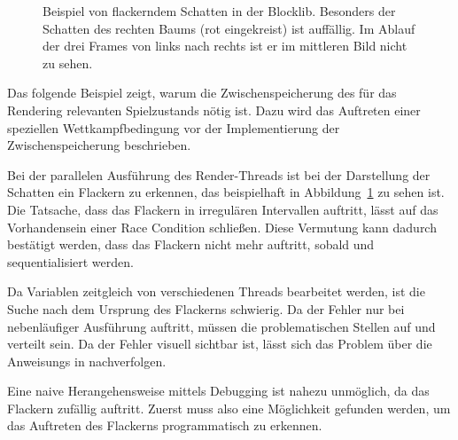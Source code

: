 \begin{figure}
	\hfill
	\hfill
	\caption[Beispiel von flackerndem Schatten in der Blocklib.]{Beispiel von flackerndem Schatten in der Blocklib. Besonders der Schatten des rechten Baums (rot eingekreist) ist auffällig. Im Ablauf der drei Frames von links nach rechts ist er im mittleren Bild nicht zu sehen.}\label{fig:flackern}
\end{figure}
Das folgende Beispiel zeigt, warum die Zwischenspeicherung des für das Rendering relevanten Spielzustands nötig ist. Dazu wird das Auftreten einer speziellen Wettkampfbedingung vor der Implementierung der Zwischenspeicherung beschrieben. 

Bei der parallelen Ausführung des Render-Threads ist bei der Darstellung der Schatten ein Flackern zu erkennen, das beispielhaft in Abbildung~\ref{fig:flackern} zu sehen ist. Die Tatsache, dass das Flackern in irregulären Intervallen auftritt, lässt auf das Vorhandensein einer Race Condition schließen. Diese Vermutung kann dadurch bestätigt werden, dass das Flackern nicht mehr auftritt, sobald  und  sequentialisiert werden.

Da Variablen zeitgleich von verschiedenen Threads bearbeitet werden, ist die Suche nach dem Ursprung des Flackerns schwierig. Da der Fehler nur bei nebenläufiger Ausführung auftritt, müssen die problematischen Stellen auf  und  verteilt sein. Da der Fehler visuell sichtbar ist, lässt sich das Problem über die \glspl{Anweisung} in  nachverfolgen. 

Eine naive Herangehensweise mittels Debugging ist nahezu unmöglich, da das Flackern zufällig auftritt. Zuerst muss also eine Möglichkeit gefunden werden, um das Auftreten des Flackerns programmatisch zu erkennen.

